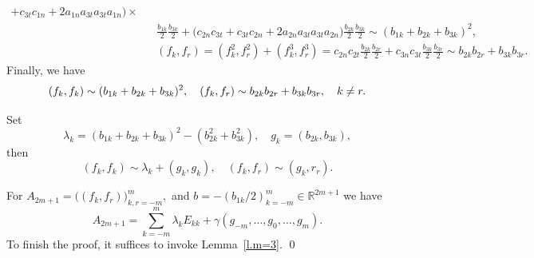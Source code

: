 \documentclass[preprint,12pt]{elsarticle}
\numberwithin{equation}{section}
\begin{document}
\begin{pf}
\begin{eqnarray*}
+c_{3t}c_{1n}+2a_{1n}a_{3t}a_{3t}a_{1n}\big)\times \\
&&
\frac{b_{1k}}{2}\frac{b_{3k}}{2}+
\big(c_{2n}c_{3t}+c_{3t}c_{2n}+2a_{2n}a_{3t}a_{3t}a_{2n}\big)\frac{b_{2k}}{2}\frac{b_{3k}}{2} \sim(b_{1k}+b_{2k}+b_{3k})^2,\\ 
&&(f_k,f_r)=(f_k^2,f_r^2)+(f_k^3,f_r^3)=
c_{2n}c_{2t}\frac{b_{2k}}{2}\frac{b_{2r}}{2}+c_{3n}c_{3t}\frac{b_{3k}}{2}\frac{b_{3r}}{2}\sim b_{2k}b_{2r}+b_{3k}b_{3r}.
\end{eqnarray*}
Finally, we have
\begin{equation}
\label{(A_{r,s}),xx1,m=2}
(f_k,f_k) \sim (b_{1k}+b_{2k}+b_{3k})^2, \quad(f_k,f_r)\sim b_{2k}b_{2r}+b_{3k}b_{3r},\quad k\not=r.
\end{equation}

Set
\begin{equation}
\lambda_k=(b_{1k}+b_{2k}+b_{3k})^2-(b_{2k}^2+b_{3k}^2),\quad g_k=(b_{2k},b_{3k}),
\end{equation}
then
\begin{equation}
(f_k,f_k)\sim \lambda_k+(g_k,g_k),\quad (f_k,f_r)\sim (g_k,r_r).
\end{equation}

For $A_{2m+1}=\big((f_k,f_r)\big)_{k,r=-m}^m,$ and
$b=-(b_{1k}/2)_{k=-m}^m\in {\mathbb R}^{2m+1}$ we have
$$
A_{2m+1}= \sum_{k=-m}^m\lambda_kE_{kk}+\gamma(g_{-m},\dots,g_0,\dots,g_m).
$$
To finish the proof, it  suffices to invoke Lemma~\ref{l.m=3}.
\qed\end{pf}
\end{document}
